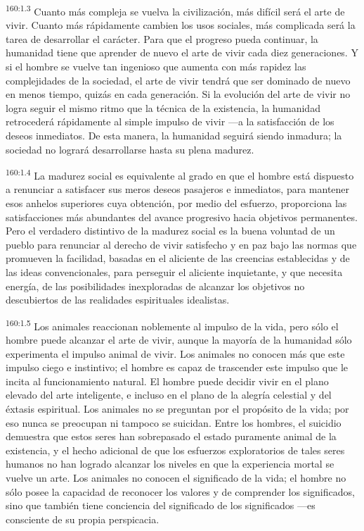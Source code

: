 \par
\textsuperscript{160:1.3} Cuanto más compleja se vuelva la civilización, más difícil será el arte de vivir. Cuanto más rápidamente cambien los usos sociales, más complicada será la tarea de desarrollar el carácter. Para que el progreso pueda continuar, la humanidad tiene que aprender de nuevo el arte de vivir cada diez generaciones. Y si el hombre se vuelve tan ingenioso que aumenta con más rapidez las complejidades de la sociedad, el arte de vivir tendrá que ser dominado de nuevo en menos tiempo, quizás en cada generación. Si la evolución del arte de vivir no logra seguir el mismo ritmo que la técnica de la existencia, la humanidad retrocederá rápidamente al simple impulso de vivir ---a la satisfacción de los deseos inmediatos. De esta manera, la humanidad seguirá siendo inmadura; la sociedad no logrará desarrollarse hasta su plena madurez.

\par
\textsuperscript{160:1.4} La madurez social es equivalente al grado en que el hombre está dispuesto a renunciar a satisfacer sus meros deseos pasajeros e inmediatos, para mantener esos anhelos superiores cuya obtención, por medio del esfuerzo, proporciona las satisfacciones más abundantes del avance progresivo hacia objetivos permanentes. Pero el verdadero distintivo de la madurez social es la buena voluntad de un pueblo para renunciar al derecho de vivir satisfecho y en paz bajo las normas que promueven la facilidad, basadas en el aliciente de las creencias establecidas y de las ideas convencionales, para perseguir el aliciente inquietante, y que necesita energía, de las posibilidades inexploradas de alcanzar los objetivos no descubiertos de las realidades espirituales idealistas.

\par
\textsuperscript{160:1.5} Los animales reaccionan noblemente al impulso de la vida, pero sólo el hombre puede alcanzar el arte de vivir, aunque la mayoría de la humanidad sólo experimenta el impulso animal de vivir. Los animales no conocen más que este impulso ciego e instintivo; el hombre es capaz de trascender este impulso que le incita al funcionamiento natural. El hombre puede decidir vivir en el plano elevado del arte inteligente, e incluso en el plano de la alegría celestial y del éxtasis espiritual. Los animales no se preguntan por el propósito de la vida; por eso nunca se preocupan ni tampoco se suicidan. Entre los hombres, el suicidio demuestra que estos seres han sobrepasado el estado puramente animal de la existencia, y el hecho adicional de que los esfuerzos exploratorios de tales seres humanos no han logrado alcanzar los niveles en que la experiencia mortal se vuelve un arte. Los animales no conocen el significado de la vida; el hombre no sólo posee la capacidad de reconocer los valores y de comprender los significados, sino que también tiene conciencia del significado de los significados ---es consciente de su propia perspicacia.

